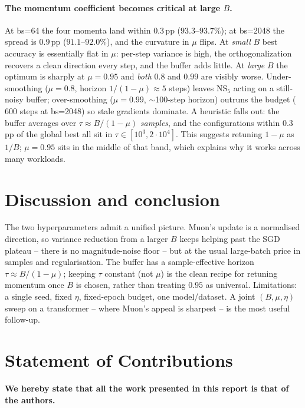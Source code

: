 \documentclass{article}
\begin{document}
\paragraph{The momentum coefficient becomes critical at large $B$.}
At bs=64 the four momenta land within $0.3$\,pp ($93.3$--$93.7\%$); at bs=2048 the spread is $0.9$\,pp ($91.1$--$92.0\%$), and the curvature in $\mu$ flips. At \emph{small} $B$ best accuracy is essentially flat in $\mu$: per-step variance is high, the orthogonalization recovers a clean direction every step, and the buffer adds little. At \emph{large} $B$ the optimum is sharply at $\mu{=}0.95$ and \emph{both} $0.8$ and $0.99$ are visibly worse. Under-smoothing ($\mu{=}0.8$, horizon $1/(1-\mu)\!\approx\!5$ steps) leaves $\mathrm{NS}_5$ acting on a still-noisy buffer; over-smoothing ($\mu{=}0.99$, $\sim$100-step horizon) outruns the budget ($600$ steps at bs=2048) so stale gradients dominate. A heuristic falls out: the buffer averages over $\tau \approx B/(1-\mu)$ \emph{samples}, and the configurations within $0.3$\,pp of the global best all sit in $\tau \in [10^3, 2\!\cdot\!10^4]$. This suggests retuning $1-\mu$ as $1/B$; $\mu{=}0.95$ sits in the middle of that band, which explains why it works across many workloads.

\section{Discussion and conclusion}

The two hyperparameters admit a unified picture. Muon's update is a normalised direction, so variance reduction from a larger $B$ keeps helping past the SGD plateau -- there is no magnitude-noise floor -- but at the usual large-batch price in samples and regularisation. The buffer has a sample-effective horizon $\tau \approx B/(1-\mu)$; keeping $\tau$ constant (not $\mu$) is the clean recipe for retuning momentum once $B$ is chosen, rather than treating $0.95$ as universal. Limitations: a single seed, fixed $\eta$, fixed-epoch budget, one model/dataset. A joint $(B,\mu,\eta)$ sweep on a transformer -- where Muon's appeal is sharpest -- is the most useful follow-up.

\section*{Statement of Contributions}
\textbf{We hereby state that all the work presented in this report is that of the authors.}



\end{document}
